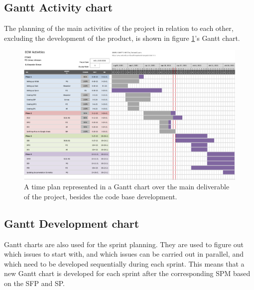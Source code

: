 \documentclass{article}
\begin{document}
\subsection{Gantt Activity chart}
The planning of the main activities of the project in relation to each other, excluding the development of the product, is shown in figure \ref{fig:GantAct}'s Gantt chart.
\begin{figure}[h!]
    \centering
    \includegraphics[scale=0.7, angle=90]{sdpFigures/GanttActiV2.png}
    \caption{A time plan represented in a Gantt chart over the main deliverable of the project, besides the code base development.}
    \label{fig:GantAct}
\end{figure}

\subsection{Gantt Development chart}
Gantt charts are also used for the sprint planning. They are used to figure out which issues to start with, and which issues can be carried out in parallel, and which need to be developed sequentially during each sprint. This means that a new Gantt chart is developed for each sprint after the corresponding SPM based on the SFP and SP. 
\end{document}
